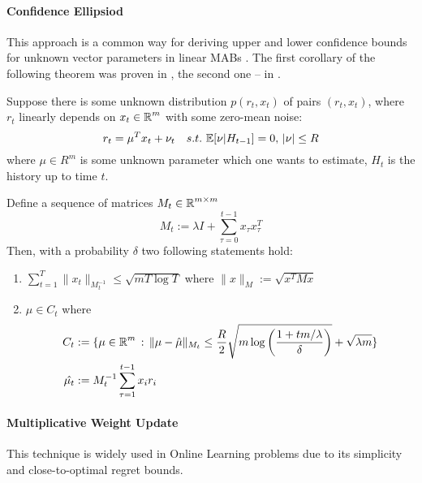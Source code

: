 \paragraph{Confidence Ellipsiod} 
This approach is a common way for deriving upper and lower confidence bounds for unknown vector parameters in linear MABs \cite{Li2011}. The first corollary of the following theorem was proven in \cite{Auer2003}, the second one -- in \cite{Abbasi-Yadkori2011}.  
\begin{theorem}
\label{theorem:ellipsoids}
    Suppose there is some unknown distribution $p(r_t, x_t)$ of pairs $(r_t, x_t)$, where $r_t$ linearly depends on $x_t \in \operatorname{\mathbb{R}}^m$ with some zero-mean noise: 
    \[
        r_t = \mu^Tx_t + \nu_t\quad s.t. \, \operatorname{\mathbb{E}}[\nu|H_{t-1}] = 0, \, |\nu| \leq R
    \]
    where $\mu \in R^m$ is some unknown parameter which one wants to estimate, $H_{t}$ is the history up to time $t$. 
    
    Define a sequence of matrices $M_t \in \operatorname{\mathbb{R}}^{m \times m}$ 
    \[
        M_t := \lambda I + \sum_{\tau = 0}^{t-1}x_\tau x_\tau^T
    \]
    Then, with a probability $\delta$ two following statements hold:
    
    \begin{enumerate}
        \item $\sum_{t=1}^T\|x_t\|_{M_t^{-1}} \leq \sqrt{mT\log{T}}$ where $\|x\|_M := \sqrt{x^TMx}$
        \item $\mu \in C_t$ where 
            \begin{equation*}
            \label{eq:confidential_ellipsoid}
            \begin{split}
                C_t & := \{\mu \in \operatorname{\mathbb{R}}^m\, : \, \|\mu - \hat{\mu}\|_{M_t} \leq \frac{R}{2}\sqrt{m\log\left(\frac{1+tm/\lambda}{\delta}\right)} + \sqrt{\lambda m}\} \\
                \hat{\mu_t} & := M^{-1}_t\sum_{\tau = 1}^{t-1}x_ir_i \\
            \end{split}
            \end{equation*}
    \end{enumerate}
\end{theorem} 

\paragraph{Multiplicative Weight Update} This technique is widely used in Online Learning problems due to its simplicity and close-to-optimal regret bounds.


